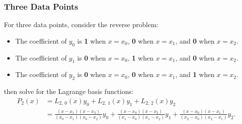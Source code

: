 \documentclass{article}
\begin{document}
\subsubsection{Three Data Points}
For three data points, consider the reverse problem:
\begin{itemize}
    \item The coefficient of \(y_0\) is \textbf{1} when \(x = x_0\),
          \textbf{0} when \(x = x_1\), and \textbf{0} when \(x = x_2\).
    \item The coefficient of \(y_1\) is \textbf{0} when \(x = x_0\),
          \textbf{1} when \(x = x_1\), and \textbf{0} when \(x = x_2\).
    \item The coefficient of \(y_2\) is \textbf{0} when \(x = x_0\),
          \textbf{0} when \(x = x_1\), and \textbf{1} when \(x = x_2\).
\end{itemize}
then solve for the Lagrange basis functions:
\begin{align*}
    P_2\left( x \right) & = L_{2,\: 0}\left( x \right) y_0 + L_{2,\: 1}\left( x \right) y_1 + L_{2,\: 2}\left( x \right) y_2                                                                                                                                                                                                                                   \\
                        & = \frac{\left( x - x_1 \right)\left( x - x_2 \right)}{\left( x_0 - x_1 \right)\left( x_0 - x_2 \right)} y_0 + \frac{\left( x - x_0 \right)\left( x - x_2 \right)}{\left( x_1 - x_0 \right)\left( x_1 - x_2 \right)} y_1 + \frac{\left( x - x_0 \right)\left( x - x_1 \right)}{\left( x_2 - x_0 \right)\left( x_2 - x_1 \right)} y_2.
\end{align*}
\end{document}
